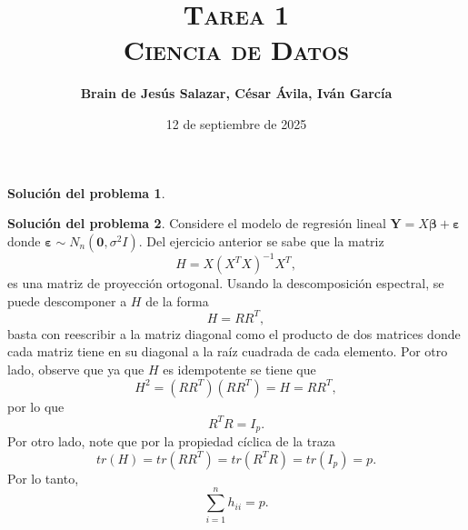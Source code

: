 \documentclass[twoside,12pt]{article}
\title{\textsc{Tarea 1\\ {\Large Ciencia de Datos}}}
\author{\large{\textbf{Brain de Jesús Salazar, César Ávila, Iván García}}}
\date{12 de septiembre de 2025}
\theoremstyle{definition}
\newtheorem{soln}{Solución del problema}
\begin{document}
\maketitle


\begin{soln}
\end{soln}


\newpage
\begin{soln}
Considere el modelo de regresión lineal $\boldsymbol{Y}=X\boldsymbol{\beta} + \boldsymbol{\varepsilon}$ donde $\boldsymbol{\varepsilon}\sim N_n(\boldsymbol{0},\sigma^2I).$ Del ejercicio anterior se sabe que la matriz 
    $$
    H=X(X^TX)^{-1}X^T,
    $$
    es una matriz de proyección ortogonal. Usando la descomposición espectral, se puede descomponer a $H$ de la forma 
    $$H=RR^T,$$
    basta con reescribir a la matriz diagonal como el producto de dos matrices donde cada matriz tiene en su diagonal a la raíz cuadrada de cada elemento. Por otro lado, observe que ya que $H$ es idempotente se tiene que
    $$
    H^2=(RR^T)(RR^T)=H=RR^T,
    $$
    por lo que $$R^TR=I_p.$$ 
    Por otro lado, note que por la propiedad cíclica de la traza
    $$
    tr(H)=tr(RR^T)=tr(R^TR)=tr(I_p)=p.
    $$
    Por lo tanto, $$
\sum_{i=1}^n h_{i i}=p.
$$
\end{soln}
\end{document}
